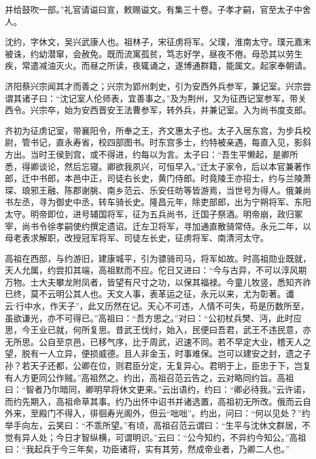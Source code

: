 \documentclass[12pt,UTF8]{ctexbook}
\begin{document}
并给鼓吹一部。”礼官请谥曰宣，敕赐谥文。有集三十卷。子孝才嗣，官至太子中舍人。

沈约，字休文，吴兴武康人也。祖林子，宋征虏将军。父璞，淮南太守。璞元嘉末被诛，约幼潜窜，会赦免。既而流寓孤贫，笃志好学，昼夜不倦。母恐其以劳生疾，常遣减油灭火。而昼之所读，夜辄诵之，遂博通群籍，能属文。起家奉朝请。

济阳蔡兴宗闻其才而善之；兴宗为郢州刺史，引为安西外兵参军，兼记室。兴宗尝谓其诸子曰：“沈记室人伦师表，宜善事之。”及为荆州，又为征西记室参军，带关西令。兴宗卒，始为安西晋安王法曹参军，转外兵，并兼记室。入为尚书度支郎。

齐初为征虏记室，带襄阳令，所奉之王，齐文惠太子也。太子入居东宫，为步兵校尉，管书记，直永寿省，校四部图书。时东宫多士，约特被亲遇，每直入见，影斜方出。当时王侯到宫，或不得进，约每以为言。太子曰：“吾生平懒起，是卿所悉，得卿谈论，然后忘寝。卿欲我夙兴，可恒早入。”迁太子家令，后以本官兼著作郎，迁中书郎，本邑中正，司徒右长史，黄门侍郎。时竟陵王亦招士，约与兰陵萧琛、琅邪王融、陈郡谢朓、南乡范云、乐安任昉等皆游焉，当世号为得人。俄兼尚书左丞，寻为御史中丞，转车骑长史。隆昌元年，除吏部郎，出为宁朔将军、东阳太守。明帝即位，进号辅国将军，征为五兵尚书，迁国子祭酒。明帝崩，政归冢宰，尚书令徐孝嗣使约撰定遗诏。迁左卫将军，寻加通直散骑常侍。永元二年，以母老表求解职，改授冠军将军、司徒左长史，征虏将军、南清河太守。

高祖在西邸，与约游旧，建康城平，引为骠骑司马，将军如故。时高祖勋业既就，天人允属，约尝扣其端，高祖默而不应。佗日又进曰：“今与古异，不可以淳风期万物。士大夫攀龙附凤者，皆望有尺寸之功，以保其福禄。今童儿牧竖，悉知齐祚已终，莫不云明公其人也。天文人事，表革运之征，永元以来，尤为彰著。谶云‘行中水，作天子”，此又历然在记。天心不可违，人情不可失，苟是历数所至，虽欲谦光，亦不可得已。”高祖曰：“吾方思之。”对曰：“公初杖兵樊、沔，此时应思，今王业已就，何所复思。昔武王伐纣，始入，民便曰吾君，武王不违民意，亦无所思。公自至京邑，已移气序，比于周武，迟速不同。若不早定大业，稽天人之望，脱有一人立异，便损威德。且人非金玉，时事难保。岂可以建安之封，遗之子孙？若天子还都，公卿在位，则君臣分定，无复异心。君明于上，臣忠于下，岂复有人方更同公作贼。”高祖然之。约出，高祖召范云告之，云对略同约旨。高祖曰：“智者乃尔暗同，卿明早将休文更来。”云出语约，约曰：“卿必待我。”云许诺，而约先期入，高祖命草其事。约乃出怀中诏书并诸选置，高祖初无所改。俄而云自外来，至殿门不得入，徘徊寿光阁外，但云“咄咄”。约出，问曰：“何以见处？”约举手向左，云笑曰：“不乖所望。”有顷，高祖召范云谓曰：“生平与沈休文群居，不觉有异人处；今日才智纵横，可谓明识。”云曰：“公今知约，不异约今知公。”高祖曰：“我起兵于今三年矣，功臣诸将，实有其劳，然成帝业者，乃卿二人也。”
\end{document}
